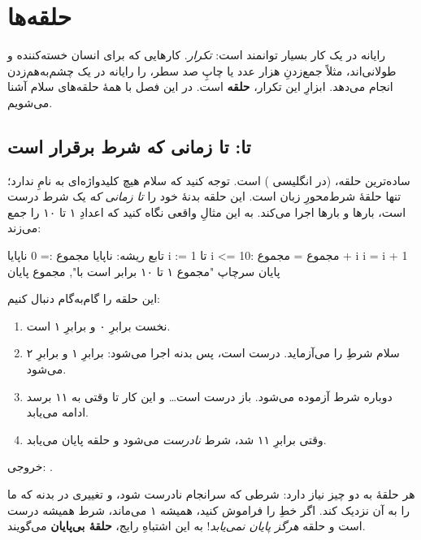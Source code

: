 \chapter{حلقه‌ها}%
\label{ch:loops}

رایانه در یک کار بسیار توانمند است: \emph{تکرار}. کارهایی که برای انسان
خسته‌کننده و طولانی‌اند، مثلاً جمع‌زدنِ هزار عدد یا چاپِ صد سطر، را رایانه
در یک چشم‌به‌هم‌زدن انجام می‌دهد. ابزارِ این تکرار، \textbf{حلقه} است. در این
فصل با همهٔ حلقه‌های سلام آشنا می‌شویم.

\section{تا: تا زمانی که شرط برقرار است}

ساده‌ترین حلقه،  (در انگلیسی ) است. توجه کنید که
سلام هیچ کلیدواژه‌ای به نامِ  ندارد؛  تنها حلقهٔ
شرط‌محورِ زبان است. این حلقه بدنهٔ خود را \emph{تا زمانی که} یک شرط درست
است، بارها و بارها اجرا می‌کند. به این مثالِ واقعی نگاه کنید که اعدادِ ۱ تا
۱۰ را جمع می‌زند:

\begin{salamfa}
تابع ریشه:
    ناپایا مجموع := 0
    ناپایا i := 1
    تا i <= 10:
        مجموع = مجموع + i
        i = i + 1
    پایان
    سرچاپ "مجموع ۱ تا ۱۰ برابر است با", مجموع
پایان
\end{salamfa}

این حلقه را گام‌به‌گام دنبال کنیم:
\begin{enumerate}
  \item نخست  برابرِ ۰ و  برابرِ ۱ است.
  \item سلام شرطِ  را می‌آزماید. درست است، پس بدنه اجرا می‌شود:
         برابرِ ۱ و  برابرِ ۲ می‌شود.
  \item دوباره شرط آزموده می‌شود. باز درست است\ldots{} و این کار تا وقتی 
        به ۱۱ برسد ادامه می‌یابد.
  \item وقتی  برابرِ ۱۱ شد، شرط \emph{نادرست} می‌شود و حلقه پایان
        می‌یابد.
\end{enumerate}

خروجی: .

\begin{warn}
هر حلقهٔ  به دو چیز نیاز دارد: شرطی که سرانجام نادرست شود، و
تغییری در بدنه که ما را به آن نزدیک کند. اگر خطِ  را فراموش
کنید،  همیشه ۱ می‌ماند، شرط همیشه درست است و حلقه \emph{هرگز پایان
نمی‌یابد}! به این اشتباهِ رایج، \textbf{حلقهٔ بی‌پایان} می‌گویند.
\end{warn}


